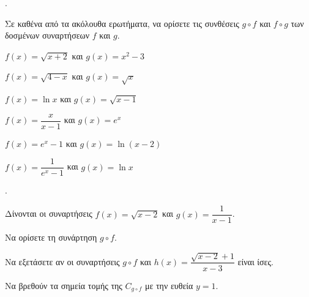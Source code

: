 \documentclass[11pt,a4paper,twocolumn]{article}
\newcounter{askhsh}
\newcommand{\askhsh}{{\large\theaskhsh.}\ \addtocounter{askhsh}{1}}
\begin{document}
\askhsh Σε καθένα από τα ακόλουθα ερωτήματα, να ορίσετε τις συνθέσεις $g\circ f$ και $f\circ g$ των δοσμένων συναρτήσεων $f$ και $g$.
\begin{alist}
\item $f(x)=\sqrt{x+2}$ και $g(x)=x^2-3$
\item $f(x)=\sqrt{4-x}$ και $g(x)=\sqrt{x}$
\item $f(x)=\ln{x}$ και $g(x)=\sqrt{x-1}$
\item $f(x)=\dfrac{x}{x-1}$ και $g(x)=e^x$
\item $f(x)=e^x-1$ και $g(x)=\ln{(x-2)}$
\item $f(x)=\dfrac{1}{e^x-1}$ και $g(x)=\ln{x}$
\end{alist}

\askhsh Δίνονται οι συναρτήσεις $f(x)=\sqrt{x-2}$ και $g(x)=\dfrac{1}{x-1}$.
\begin{alist}
\item Να ορίσετε τη συνάρτηση $g\circ f$.
\item Να εξετάσετε αν οι συναρτήσεις $g\circ f$ και $h(x)=\dfrac{\sqrt{x-2}+1}{x-3}$ είναι ίσες.
\item Να βρεθούν τα σημεία τομής της $C_{g\circ f}$ με την ευθεία $y=1$.
\end{alist}
\end{document}
